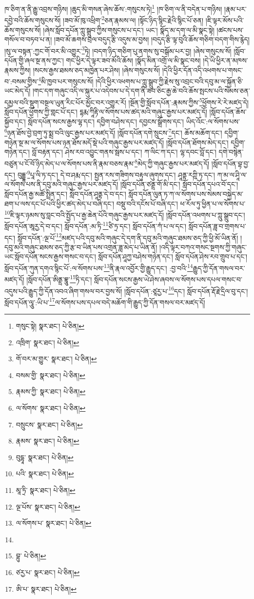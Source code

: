ཁ་ཅིག་ན་ནི་རྒྱུ་འབྲས་གཉིས། །ཆུད་མི་གསན་ཞེས་ཆོས་:གསུངས་ཏེ།\footnote{གསུང་སྟེ།  སྣར་ཐང་།  པེ་ཅིན། } །ཁ་ཅིག་ལ་ནི་བདེན་པ་གཉིས། །རྣམ་པར་དབྱེ་བའི་ཆོས་གསུངས་སོ། །ཟབ་མོ་ཁུ་འཕྲིག་\footnote{འཁྲིག་  སྣར་ཐང་།  པེ་ཅིན། }ཅན་རྣམས་ལ། །སྟོང་ཉིད་སྙིང་རྗེའི་སྙིང་པོ་ཅན། །ཇི་ལྟར་མོས་པའི་ཆོས་གསུངས་སོ། །ཞེས་སློབ་དཔོན་ཀླུ་སྒྲུབ་ཀྱིས་གསུངས་པ་དང་། ཡང་། སྣོད་མ་དག་ལ་མི་སྣང་སྟེ། །ཚངས་པས་གསོལ་བ་བཏབ་པ་ན། །ཟབ་མོ་ཆགས་བྲལ་བདུད་རྩི་འདུས་མ་བྱས། །བདུད་རྩི་ལྟ་བུའི་ཆོས་གཅིག་བདག་གིས་རྙེད། །སུ་ལ་བསྟན་:ཀྱང་གོ་བར་མི་འགྱུར་\footnote{གོ་བར་མ་གྱུར་  སྣར་ཐང་།  པེ་ཅིན། }ཏེ། །བདག་ཉིད་གཅིག་པུ་ནགས་སུ་བསྒོམ་པར་བྱ། །ཞེས་གསུངས་སོ། །སློབ་དཔོན་གྱི་ཞལ་སྔ་ནས་ཀྱང་། གང་ཕྱིར་དེ་ལྟར་ཟབ་མོའི་ཆོས། །སྣོད་མིན་འགྲོ་ལ་མི་སྣང་བས། །དེ་ཡི་ཕྱིར་ན་མཁས་རྣམས་ཀྱིས། །སངས་རྒྱས་ཐམས་ཅད་མཁྱེན་པར་ཤེས། །ཞེས་གསུངས་སོ། །དེའི་ཕྱིར་དོན་འདི་འཕགས་པ་གསང་བ་:བསམ་གྱིས་\footnote{བསམ་གྱི་  སྣར་ཐང་།  པེ་ཅིན། }མི་ཁྱབ་པར་གསུངས་སོ། །དེའི་ཕྱིར་འཕགས་པ་ཀླུ་སྒྲུབ་ཀྱི་རྗེས་སུ་འབྲང་བའི་དབུ་མ་ལ་སྐྱོན་ཅི་ཡང་མེད་དོ། །གང་དག་གཞུང་འདི་ལ་སྐུར་པ་འདེབས་པ་དེ་དག་ནི་ཟབ་ཅིང་རྒྱ་ཆེ་བའི་ཆོས་སྤངས་པའི་སེམས་ཅན་དམྱལ་བའི་སྡུག་བསྔལ་ཡུན་རིང་པོར་མྱོང་བར་འགྱུར་རོ། །སྔོན་གྱི་སློབ་དཔོན་:རྣམས་ཀྱིས་\footnote{རྣམས་ཀྱི་  སྣར་ཐང་།  པེ་ཅིན། }ཕྱོགས་རེ་རེ་མཛད་དེ། སློབ་དཔོན་ཕྱོགས་ཀྱི་གླང་པོ་དང་། དྷརྨ་ཀཱིརྟི་ལ་སོགས་པས་ཚད་མའི་གཞུང་རྒྱས་པར་མཛད་དོ། །སློབ་དཔོན་ཆོས་སྐྱོབ་དང་། སློབ་དཔོན་སངས་རྒྱས་ལྷ་དང་། དབྱིག་བཤེས་དང་། དབྱངས་སྒྲོགས་དང་། ཡིད་འོང་:ལ་སོགས་པས་\footnote{ལ་སོགས་  སྣར་ཐང་།  པེ་ཅིན། }ཉན་ཐོས་བྱེ་བྲག་ཏུ་སྨྲ་བའི་ལུང་རྒྱས་པར་མཛད་དོ། །སློབ་དཔོན་དགེ་སྲུངས་\footnote{བསྲུངས་  སྣར་ཐང་།  པེ་ཅིན། }དང་། ཆོས་མཆོག་དང་། དབྱིག་གཉེན་སྔ་མ་ལ་སོགས་པས་ཉན་ཐོས་མདོ་སྡེ་པའི་གཞུང་རྒྱས་པར་མཛད་དོ། །སློབ་དཔོན་ཐོགས་མེད་དང་། དབྱིག་གཉེན་དང་། བློ་བརྟན་དང་། ཤེས་རབ་འབྱུང་གནས་སྦས་པ་དང་། ཀ་ལིང་ཀ་དང་། ལྷ་དབང་བློ་དང་། དགེ་བསྙེན་བཙུན་པ་ངོ་བོ་ཉིད་མེད་པ་ལ་སོགས་པས་ནི་རྣམ་བཅས་རྣམ་\footnote{རྣམས་  སྣར་ཐང་།  པེ་ཅིན། }མེད་ཀྱི་གཞུང་རྒྱས་པར་མཛད་དོ། །སློབ་དཔོན་བྷ་བྱ་དང་། བུདྡྷ་\footnote{བུདྷཱ་  སྣར་ཐང་།  པེ་ཅིན། }པཱ་ལི་ཏ་དང་། དེ་བ་ཤརྨ་དང་། སྤྱན་རས་གཟིགས་བརྟུལ་ཞུགས་དང་། ཤཱནྟ་རཀྵི་ཏ་དང་། ཀ་མ་ལ་ཤཱི་ལ་ལ་སོགས་པས་ནི་དབུ་མའི་གཞུང་རྒྱས་པར་མཛད་དོ། །སློབ་དཔོན་ཙནྡྲ་གོ་མི་དང་། སློབ་དཔོན་དཔའ་བོ་དང་། སློབ་དཔོན་རྒྱ་མཚོ་སྤྲིན་དང་། སློབ་དཔོན་ཤཱནྟ་དེ་བ་དང་། སློབ་དཔོན་ལུན་ཏ་ཀ་ལ་སོགས་པས་སེམས་བསྐྱེད་མ་ཐག་པ་ལས་དང་པོ་པའི་ཕྱིར་ཚད་མེད་པ་བཞི་དང་། བསྡུ་བའི་དངོས་པོ་བཞི་དང་། ཕ་རོལ་ཏུ་ཕྱིན་པ་ལ་སོགས་པ་\footnote{པའི་  སྣར་ཐང་།  པེ་ཅིན། }ཇི་ལྟར་ཉམས་སུ་བླང་བའི་སྤྱོད་པ་རྒྱ་ཆེན་པོའི་གཞུང་རྒྱས་པར་མཛད་དོ། །སློབ་དཔོན་འཕགས་པ་ཀླུ་སྒྲུབ་དང་། སློབ་དཔོན་ཨཱརྱ་དེ་བ་དང་། སློབ་དཔོན་:མ་ཏི་\footnote{མཱ་ཏྲི་  སྣར་ཐང་།  པེ་ཅིན། }ཙི་ཏྲ་དང་། སློབ་དཔོན་ཀཾ་པ་ལ་དང་། སློབ་དཔོན་ཟླ་བ་གྲགས་པ་དང་། སློབ་དཔོན་:ལྔ་པོ་\footnote{ལྔ་པོས་  སྣར་ཐང་།  པེ་ཅིན། }མཛད་པའི་དབུ་མའི་གཞུང་དེ་དག་ནི་དབུ་མའི་གཞུང་ཐམས་ཅད་ཀྱི་ཕྱི་མོ་ཡིན་ནོ། །དབུ་མའི་གཞུང་ཐམས་ཅད་ཀྱི་རྩ་བ་ཡིན་པས་འགྲན་ཟླ་མེད་པ་ཡིན་ནོ། །འདི་ལྟར་བཀའ་གསང་སྔགས་ཀྱི་གཞུང་ཡང་སློབ་དཔོན་སངས་རྒྱས་གསང་བ་དང་། སློབ་དཔོན་ཤཱཀྱ་བཤེས་གཉེན་དང་། སློབ་དཔོན་ཤེས་རབ་གྲུབ་པ་དང་། སློབ་དཔོན་ཀུན་དགའ་སྙིང་པོ་:ལ་སོགས་པས་\footnote{ལ་སོགས་པ་  སྣར་ཐང་།  པེ་ཅིན། }ནི་རྣལ་འབྱོར་གྱི་རྒྱུད་དང་། :བྱ་བའི་\footnote{}རྒྱུད་ཀྱི་དོན་གསལ་བར་མཛད་དོ། །སློབ་དཔོན་ཨིནྡྲ་བྷཱུ་\footnote{བྷུ་  པེ་ཅིན། }ཏི་དང་། སློབ་དཔོན་སངས་རྒྱས་ཡེ་ཤེས་ཞབས་ལ་སོགས་པས་དཔལ་གསང་བ་འདུས་པའི་རྒྱུད་ཀྱི་དོན་འབའ་ཞིག་གསལ་བར་བྱས་སོ། །སློབ་དཔོན་:ཙཱརྱ་པ་\footnote{ཙརྱ་པ་  སྣར་ཐང་།  པེ་ཅིན། }དང་། སློབ་དཔོན་རྡོ་རྗེ་དྲིལ་བུ་དང་། སློབ་དཔོན་ལཱུ་:ཡི་པ་\footnote{ཨི་པ་  སྣར་ཐང་།  པེ་ཅིན། }ལ་སོགས་པས་དཔལ་བདེ་མཆོག་གི་རྒྱུད་ཀྱི་དོན་གསལ་བར་མཛད་དོ། 